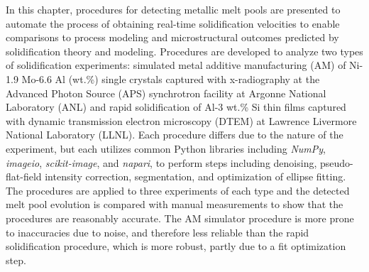 In this chapter, procedures for detecting metallic melt pools are
presented to automate the
process of obtaining real-time solidification velocities to enable
comparisons to process modeling and microstructural outcomes predicted by
solidification theory and modeling. Procedures are developed to analyze
two types of solidification experiments: simulated metal
additive manufacturing (AM) of Ni-1.9 Mo-6.6 Al (wt.\%)
single crystals captured with x-radiography at the Advanced Photon Source
(APS) synchrotron facility at Argonne National Laboratory (ANL) and rapid
solidification of Al-3 wt.\% Si thin films captured with dynamic transmission
electron microscopy (DTEM) at Lawrence Livermore National Laboratory
(LLNL). Each procedure differs due to the nature of the experiment, but
each utilizes common Python libraries including \textit{NumPy},
\textit{imageio}, \textit{scikit-image}, and \textit{napari},
to perform steps including denoising, pseudo-flat-field intensity
correction, segmentation, and optimization of ellipse fitting.
The procedures are applied to three experiments of each type and the
detected melt pool evolution is compared with
manual measurements to show that the procedures are reasonably accurate.
The AM simulator procedure is more prone to inaccuracies due to noise,
and therefore less reliable than the rapid solidification procedure, which
is more robust, partly due to a fit optimization step.

